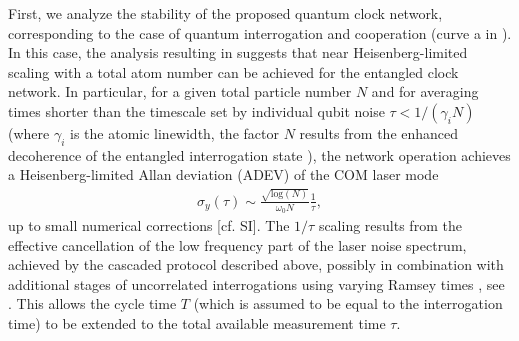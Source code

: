 First, we analyze the stability of the proposed quantum clock network,
corresponding to the case of quantum interrogation and cooperation (curve a in
). In this case, the analysis resulting in 
suggests that near Heisenberg-limited  scaling with a total atom number can be achieved
for the entangled clock network. 
In particular, for a given total particle number $N$ and for averaging times
shorter than the timescale set by individual qubit noise $\tau < 1/(\gamma_i N)$
(where $\gamma_i$ is the atomic linewidth, the factor $N$ results from the
enhanced decoherence of the entangled interrogation state
\cite{Huelga1997}), the network operation achieves a Heisenberg-limited Allan
deviation (ADEV) of the COM laser mode
\begin{align}
\label{eq:ADEV1}
 	\sigma_y(\tau) 
	\sim \frac{ \sqrt{\textrm{log}(N)}}{\omega_0 N} \frac{1}{\tau},
\end{align}
up to small numerical corrections [cf. SI].
The $1/\tau$ scaling results from the effective cancellation of the low
frequency part of the laser noise spectrum, achieved
by the cascaded protocol described above, possibly in combination with additional stages of uncorrelated interrogations using varying Ramsey times \cite{Rosenband:2013vp,Borregaard2013}, see \cite{Kessler2013}.
This allows the cycle time $T$ (which is assumed to be equal to
the interrogation time) to be extended to the total available measurement time
$\tau$.
